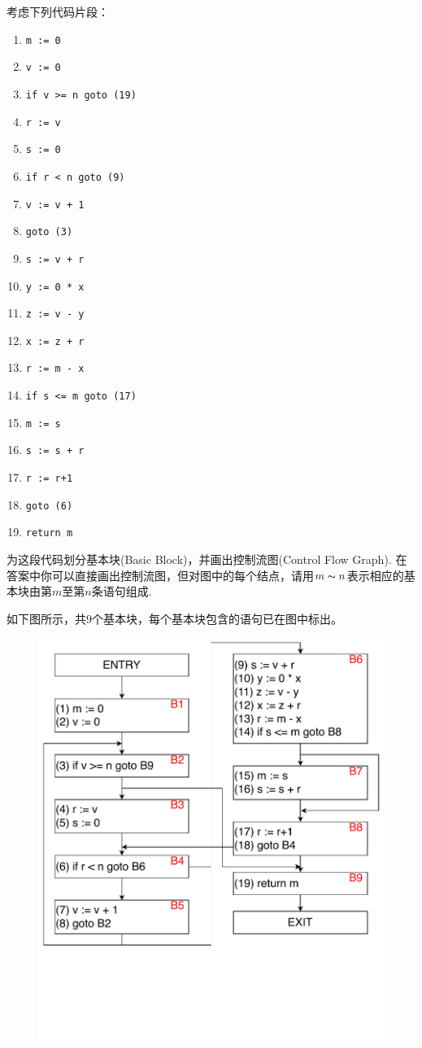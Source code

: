 \documentclass[logo,reportComp]{thesis}
\begin{document}
\begin{question}
考虑下列代码片段：
\begin{enumerate}[label=(\arabic*)]
\item \verb'm := 0'
\item \verb'v := 0'
\item \verb'if v >= n goto (19)'
\item \verb'r := v'
\item \verb's := 0'
\item \verb'if r < n goto (9)'
\item \verb'v := v + 1'
\item \verb'goto (3)'
\item \verb's := v + r'
\item \verb'y := 0 * x'
\item \verb'z := v - y'
\item \verb'x := z + r'
\item \verb'r := m - x'
\item \verb'if s <= m goto (17)'
\item \verb'm := s'
\item \verb's := s + r'
\item \verb'r := r+1'
\item \verb'goto (6)'
\item \verb'return m'
\end{enumerate}
为这段代码划分基本块(Basic Block)，并画出控制流图(Control Flow Graph).
在答案中你可以直接画出控制流图，但对图中的每个结点，请用$m\thicksim n$表示相应的基本块由第$m$至第$n$条语句组成.
\end{question}
\begin{answer}
如下图所示，共$9$个基本块，每个基本块包含的语句已在图中标出。
\begin{figure}[H]
\centering
\includegraphics[width=0.7\linewidth]{fig/dag-2.pdf}
\end{figure}
\end{answer}
\end{document}
